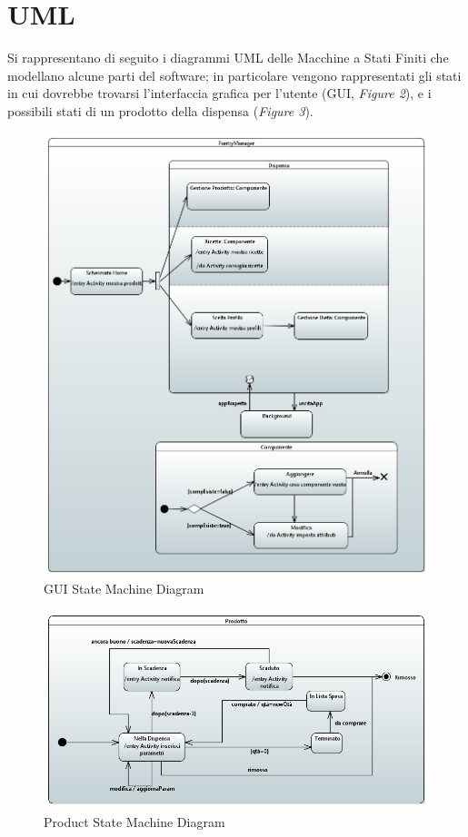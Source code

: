 \documentclass{article}
\begin{document}
\section{UML}
Si rappresentano di seguito i diagrammi UML delle Macchine a Stati Finiti che modellano alcune parti del software; in particolare vengono rappresentati gli stati in cui dovrebbe trovarsi l'interfaccia grafica per l'utente (GUI, \textit{Figure 2}), e i possibili stati di un prodotto della dispensa (\textit{Figure 3}). 

\begin{figure}[H]
    \centering
    \includegraphics[width=\linewidth]{imgs/GUISttMchnDgrm.png}
    \caption{GUI State Machine Diagram}
    \label{fig:enter-label}
\end{figure}
\begin{figure}[H]
    \centering
    \includegraphics[width=\linewidth]{imgs/ProdottoSttMchnDgrm.png}
    \caption{Product State Machine Diagram}
    \label{fig:enter-label}
\end{figure}
\end{document}
